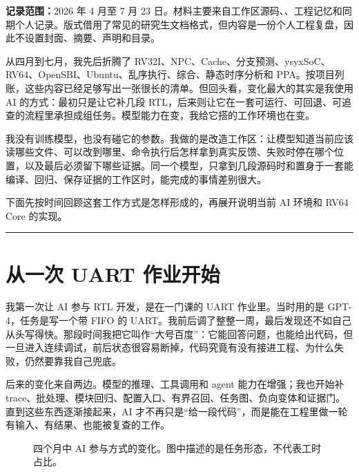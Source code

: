 \documentclass[UTF8,a4paper,zihao=-4,oneside]{ctexart}
\newcommand{\taskpath}[1]{\path{#1}}
\newcommand{\articlepart}[1]{%
  \par\bigskip
  \noindent{\zihao{2}\heiti #1}\par
  \vspace{0.45em}
  \noindent\rule{\linewidth}{0.7pt}\par
  \medskip
}
\begin{document}
\thispagestyle{plain}
\noindent\textbf{记录范围：}2026 年 4 月至 7 月 23 日。材料主要来自工作区源码、\taskpath{.github/task-runs/}、工程记忆和同期个人记录。版式借用了常见的研究生文档格式，但内容是一份个人工程复盘，因此不设置封面、摘要、声明和目录。

从四月到七月，我先后折腾了 RV32I、NPC、Cache、分支预测、ysyxSoC、RV64、OpenSBI、Ubuntu、乱序执行、综合、静态时序分析和 PPA。按项目列账，这些内容已经足够写出一张很长的清单。但回头看，变化最大的其实是我使用 AI 的方式：最初只是让它补几段 RTL，后来则让它在一套可运行、可回退、可追查的流程里承担成组任务。模型能力在变，我给它搭的工作环境也在变。

我没有训练模型，也没有碰它的参数。我做的是改造工作区：让模型知道当前应该读哪些文件、可以改到哪里、命令执行后怎样拿到真实反馈、失败时停在哪个位置，以及最后必须留下哪些证据。同一个模型，只拿到几段源码时和置身于一套能编译、回归、保存证据的工作区时，能完成的事情差别很大。

下面先按时间回顾这套工作方式是怎样形成的，再展开说明当前 AI 环境和 RV64 Core 的实现。

\articlepart{一、过去}

\section{从一次 UART 作业开始}

我第一次让 AI 参与 RTL 开发，是在一门课的 UART 作业里。当时用的是 GPT-4，任务是写一个带 FIFO 的 UART。我前后调了整整一周，最后发现还不如自己从头写得快。那段时间我把它叫作“大号百度”：它能回答问题，也能给出代码，但一旦进入连续调试，前后状态很容易断掉，代码究竟有没有接进工程、为什么失败，仍然要靠我自己兜底。

后来的变化来自两边。模型的推理、工具调用和 agent 能力在增强；我也开始补 trace、批处理、模块回归、配置入口、有界召回、任务图、负向变体和证据门。直到这些东西逐渐接起来，AI 才不再只是“给一段代码”，而是能在工程里做一轮有输入、有结果、也能被复查的工作。

\begin{figure}[htbp]
  \centering
  \caption{四个月中 AI 参与方式的变化。图中描述的是任务形态，不代表工时占比。}
\end{figure}
\end{document}
